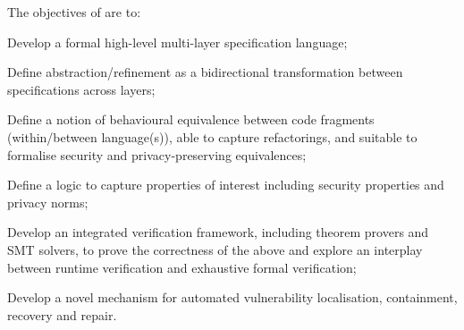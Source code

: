 \addtocounter{wpno}{1}
\begin{Workpackage}{\thewpno}
\WPTitle{\wpname{\thewpno}}


\begin{WPObjectives}
The objectives of \theWP{} are to:
\begin{compactitem}
\item Develop a formal high-level multi-layer specification language; %
\item Define abstraction/refinement as a bidirectional transformation between specifications across layers;
\item Define a notion of behavioural equivalence between code fragments (within/between language(s)), able to capture refactorings, and suitable to formalise security and privacy-preserving equivalences;
\item Define a logic to capture properties of interest  %
including security properties and privacy norms;
\item Develop an integrated verification framework, including theorem provers and SMT solvers, to prove the correctness of the above and 
 explore an interplay between runtime verification and exhaustive formal verification;
\item Develop a novel mechanism for automated vulnerability localisation, containment, recovery and repair.

\end{compactitem}

\end{WPObjectives}


\end{Workpackage}
